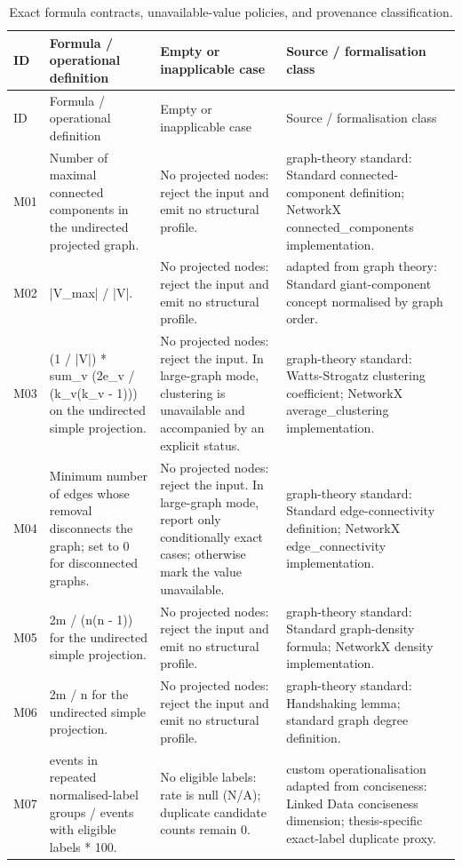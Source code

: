 \begin{longtable}{p{}p{}p{}p{}}
\caption{Exact formula contracts, unavailable-value policies, and provenance classification.}\label{tab:core_metric_inventory_contracts}\\
\toprule ID & Formula / operational definition & Empty or inapplicable case & Source / formalisation class \\
\midrule\endfirsthead
\toprule ID & Formula / operational definition & Empty or inapplicable case & Source / formalisation class \\
\midrule\endhead
\bottomrule\endfoot
M01 & Number of maximal connected components in the undirected projected graph. & No projected nodes: reject the input and emit no structural profile. & graph-theory standard: Standard connected-component definition; NetworkX connected\_components implementation. \\
M02 & |V\_max| / |V|. & No projected nodes: reject the input and emit no structural profile. & adapted from graph theory: Standard giant-component concept normalised by graph order. \\
M03 & (1 / |V|) * sum\_v (2e\_v / (k\_v(k\_v - 1))) on the undirected simple projection. & No projected nodes: reject the input. In large-graph mode, clustering is unavailable and accompanied by an explicit status. & graph-theory standard: Watts-Strogatz clustering coefficient; NetworkX average\_clustering implementation. \\
M04 & Minimum number of edges whose removal disconnects the graph; set to 0 for disconnected graphs. & No projected nodes: reject the input. In large-graph mode, report only conditionally exact cases; otherwise mark the value unavailable. & graph-theory standard: Standard edge-connectivity definition; NetworkX edge\_connectivity implementation. \\
M05 & 2m / (n(n - 1)) for the undirected simple projection. & No projected nodes: reject the input and emit no structural profile. & graph-theory standard: Standard graph-density formula; NetworkX density implementation. \\
M06 & 2m / n for the undirected simple projection. & No projected nodes: reject the input and emit no structural profile. & graph-theory standard: Handshaking lemma; standard graph degree definition. \\
M07 & events in repeated normalised-label groups / events with eligible labels * 100. & No eligible labels: rate is null (N/A); duplicate candidate counts remain 0. & custom operationalisation adapted from conciseness: Linked Data conciseness dimension; thesis-specific exact-label duplicate proxy. \\

\end{longtable}
